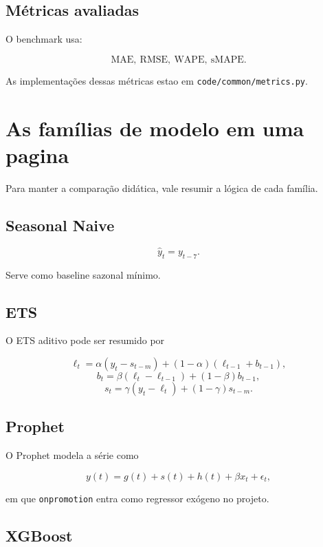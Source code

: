\documentclass[12pt]{article}
\begin{document}
\subsection{Métricas avaliadas}\label{34-muxe9tricas-avaliadas}

O benchmark usa:

\[
\mathrm{MAE},\ \mathrm{RMSE},\ \mathrm{WAPE},\ \mathrm{sMAPE}.
\]

As implementações dessas métricas estao em \texttt{code/common/metrics.py}.

\section{As famílias de modelo em uma pagina}\label{4-as-famuxedlias-de-modelo-em-uma-pagina}

Para manter a comparação didática, vale resumir a lógica de cada família.

\subsection{Seasonal Naive}\label{41-seasonal-naive}

\[
\hat{y}_t = y_{t-7}.
\]

Serve como baseline sazonal mínimo.

\subsection{ETS}\label{42-ets}

O ETS aditivo pode ser resumido por

\[
\ell_t = \alpha (y_t - s_{t-m}) + (1 - \alpha)(\ell_{t-1} + b_{t-1}),
\]
\[
b_t = \beta (\ell_t - \ell_{t-1}) + (1 - \beta) b_{t-1},
\]
\[
s_t = \gamma (y_t - \ell_t) + (1 - \gamma) s_{t-m}.
\]

\subsection{Prophet}\label{43-prophet}

O Prophet modela a série como

\[
y(t) = g(t) + s(t) + h(t) + \beta x_t + \epsilon_t,
\]

em que \texttt{onpromotion} entra como regressor exógeno no projeto.

\subsection{XGBoost}\label{44-xgboost}
\end{document}
